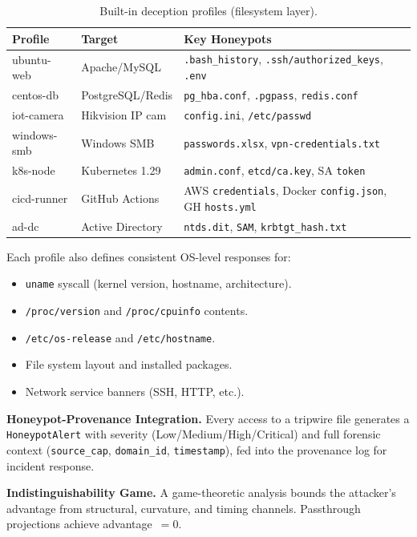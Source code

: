 \documentclass[11pt,a4paper,twoside]{report}
\theoremstyle{definition}
\begin{document}
\begin{table}[H]
\centering
\caption{Built-in deception profiles (filesystem layer).}
\begin{tabularx}{\textwidth}{l l X}
\toprule
\textbf{Profile} & \textbf{Target} & \textbf{Key Honeypots} \\
\midrule
ubuntu-web  & Apache/MySQL   & \texttt{.bash\_history}, \texttt{.ssh/authorized\_keys}, \texttt{.env} \\
centos-db   & PostgreSQL/Redis & \texttt{pg\_hba.conf}, \texttt{.pgpass}, \texttt{redis.conf} \\
iot-camera  & Hikvision IP cam & \texttt{config.ini}, \texttt{/etc/passwd} \\
windows-smb & Windows SMB    & \texttt{passwords.xlsx}, \texttt{vpn-credentials.txt} \\
k8s-node    & Kubernetes 1.29 & \texttt{admin.conf}, \texttt{etcd/ca.key}, SA \texttt{token} \\
cicd-runner & GitHub Actions & AWS \texttt{credentials}, Docker \texttt{config.json}, GH \texttt{hosts.yml} \\
ad-dc       & Active Directory & \texttt{ntds.dit}, \texttt{SAM}, \texttt{krbtgt\_hash.txt} \\
\bottomrule
\end{tabularx}
\end{table}

Each profile also defines consistent OS-level responses for:
\begin{itemize}[leftmargin=1.4em]
  \item \texttt{uname} syscall (kernel version, hostname, architecture).
  \item \texttt{/proc/version} and \texttt{/proc/cpuinfo} contents.
  \item \texttt{/etc/os-release} and \texttt{/etc/hostname}.
  \item File system layout and installed packages.
  \item Network service banners (SSH, HTTP, etc.).
\end{itemize}

\textbf{Honeypot-Provenance Integration.}  Every access to a tripwire file
generates a \texttt{HoneypotAlert} with severity (Low/Medium/High/Critical)
and full forensic context (\texttt{source\_cap}, \texttt{domain\_id},
\texttt{timestamp}), fed into the provenance log for incident response.

\textbf{Indistinguishability Game.}  A game-theoretic analysis bounds the
attacker's advantage from structural, curvature, and timing channels.
Passthrough projections achieve advantage~$= 0$.
\end{document}

